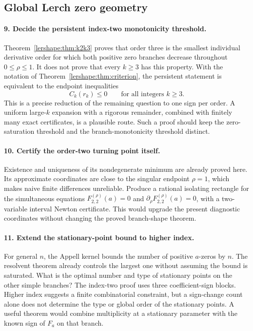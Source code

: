 \subsection{Global Lerch zero geometry}

\paragraph{9. Decide the persistent index-two monotonicity threshold.}
Theorem~\ref{lershape:thm:k2k3} proves that order three is the smallest
individual derivative order for which both positive zero branches
decrease throughout $0\le\rho\le1$. It does not prove that every
$k\ge3$ has this property. With the notation of
Theorem~\ref{lershape:thm:criterion}, the persistent statement is
equivalent to the endpoint inequalities
\[
 C_k(r_k)\le0\qquad\text{for all integers }k\ge3.
\]
This is a precise reduction of the remaining question to one sign per
order. A uniform large-$k$ expansion with a rigorous remainder,
combined with finitely many exact certificates, is a plausible route.
Such a proof should keep the zero-saturation threshold and the
branch-monotonicity threshold distinct.

\paragraph{10. Certify the order-two turning point itself.}
Existence and uniqueness of its nondegenerate minimum are already
proved here. Its approximate coordinates are close to the singular
endpoint $\rho=1$, which makes naive finite differences unreliable.
Produce a rational isolating rectangle for the simultaneous equations
$F_{2,2}^{(\rho)}(a)=0$ and
$\partial_\rho F_{2,2}^{(\rho)}(a)=0$, with a two-variable interval
Newton certificate. This would upgrade the present diagnostic
coordinates without changing the proved branch-shape theorem.

\paragraph{11. Extend the stationary-point bound to higher index.}
For general $n$, the Appell kernel bounds the number of positive
$a$-zeros by $n$. The resolvent theorem already controls the largest
one without assuming the bound is saturated. What is the optimal
number and type of stationary points on the other simple branches?
The index-two proof uses three coefficient-sign blocks. Higher index
suggests a finite combinatorial constraint, but a sign-change count
alone does not determine the type or global order of the stationary
points. A useful theorem would combine multiplicity at a stationary
parameter with the known sign of $F_a$ on that branch.

